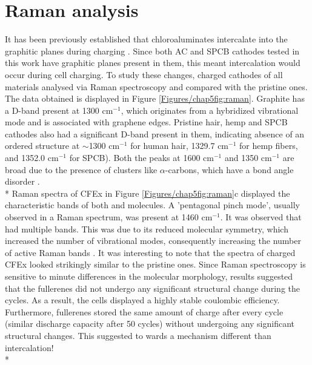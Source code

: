 \section*{Raman analysis}
It has been previously established that chloroaluminates intercalate into the graphitic planes during charging \cite{lin_ultrafast_2015-3}. Since both AC and SPCB cathodes tested in this work have graphitic planes present in them, this meant intercalation would occur during cell charging. To study these changes, charged cathodes of all materials analysed via Raman spectroscopy and compared with the pristine ones. The data obtained is displayed in Figure \ref{Figures/chap5fig:raman}. Graphite has a D-band present at 1300 cm$^{-1}$, which originates from a hybridized vibrational mode and is associated with graphene edges. Pristine hair, hemp and SPCB cathodes also had a significant D-band present in them, indicating absence of an ordered structure at $\sim$1300 cm$^{-1}$ for human hair, 1329.7 cm$^{-1}$ for hemp fibers, and 1352.0 cm$^{-1}$ for SPCB). Both the peaks at 1600 cm$^{-1}$ and 1350 cm$^{-1}$ are broad due to the presence of  clusters like $\alpha$-carbons, which have a bond angle disorder \cite{shimodaira_raman_2002}.\\*
Raman spectra of CFEx in Figure \ref{Figures/chap5fig:raman}c displayed the characteristic bands of both  and  molecules. A 'pentagonal pinch mode', usually observed in a  Raman spectrum, was present at 1460 cm$^{-1}$. It was observed that  had multiple bands. This was due to its reduced molecular symmetry, which increased the number of vibrational modes, consequently increasing the number of active Raman bands \cite{kimbrell_analysis_2014}. It was interesting to note that the spectra of charged CFEx looked strikingly similar to the pristine ones. Since Raman spectroscopy is sensitive to minute differences in the molecular morphology, results suggested that the fullerenes did not undergo any significant structural change during the cycles. As a result, the cells displayed a highly stable coulombic efficiency. Furthermore, fullerenes stored the same amount of charge after every cycle (similar discharge capacity after 50 cycles) without undergoing any significant structural changes. This suggested to wards a mechanism different than intercalation!\\* 
